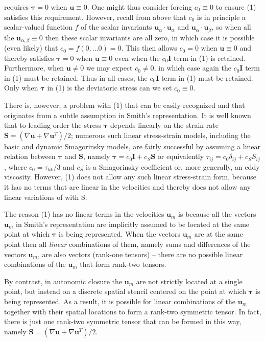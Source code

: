 requires $\mathbf{\tau} = 0$  when $\mathbf{u} \equiv 0$. One might thus consider forcing $c_0 \equiv 0$  to ensure (1) satisfies this requirement.  However, recall from above that $c_0$  is in principle a scalar-valued function $f$  of the scalar invariants  $\mathbf{u}_{\alpha} \cdot \mathbf{u}_{\alpha}$ and $\mathbf{u}_{\alpha} \cdot \mathbf{u}_{\beta}$, so when all the  $\mathbf{u}_{\alpha, \beta} \equiv 0$ then these scalar invariants are all zero, in which case it is possible (even likely) that $c_0 = f(0,\ldots0) = 0$.  This then allows $c_0 = 0$   when  $\mathbf{u} \equiv 0$ and thereby satisfies $\mathbf{\tau} = 0$  when  $\mathbf{u} \equiv 0$ even when the $c_0 \mathbf{I}$  term in (1) is retained.  Furthermore, when $\mathbf{u} \neq 0$  we may expect $c_0 \neq 0$, in which case again the $c_0 \mathbf{I}$ term in (1) must be retained.  Thus in all cases, the  $c_0 \mathbf{I}$ term in (1) must be retained.  Only when  $\mathbf{\tau}$ in (1) is the deviatoric stress can we set $c_0 \equiv 0$.

There is, however, a problem with (1) that can be easily recognized and that originates from a subtle assumption in Smith’s representation.  It is well known that to leading order the stress  $\mathbf{\tau}$ depends linearly on the strain rate $\mathbf{S} = (\nabla \mathbf{u} + \nabla \mathbf{u}^T)/2$; numerous such linear stress-strain models, including the basic and dynamic Smagorinsky models, are fairly successful by assuming a linear relation between $\mathbf{\tau}$  and $\mathbf{S}$, namely $\mathbf{\tau} = c_0\mathbf{I} + c_S \mathbf{S}$  or equivalently $\tau_{ij} = c_0\delta_{ij} + c_S S_{ij}$, where $c_0 = \tau_{kk}/3$  and $c_S$  is a Smagorinsky coefficient or, more generally, an eddy viscosity.  However, (1) does not allow any such linear stress-strain form, because it has no terms that are linear in the velocities   and thereby does not allow any linear variations of   with S.

The reason (1) has no linear terms in the velocities $\mathbf{u}_{m}$ is because all the vectors $\mathbf{u}_{m}$ in Smith’s representation are implicitly assumed to be located at the same point at which $\mathbf{\tau}$  is being represented. When the vectors $\mathbf{u}_{m}$  are at the same point then all \textit{linear} combinations of them, namely sums and differences of the vectors $\mathbf{u}_{m}$, are also vectors (rank-one tensors) – there are no possible linear combinations of the $\mathbf{u}_{m}$ that form rank-two tensors.

By contrast, in autonomic closure the $\mathbf{u}_{m}$  are not strictly located at a single point, but instead on a discrete spatial stencil centered on the point at which $\mathbf{\tau}$  is being represented.  As a result, it is possible for linear combinations of the $\mathbf{u}_{m}$  together with their spatial locations to form a rank-two symmetric tensor. In fact, there is just one rank-two symmetric tensor that can be formed in this way, namely $\mathbf{S} = (\nabla \mathbf{u} + \nabla \mathbf{u}^T)/2$.

